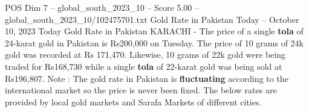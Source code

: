 \begin{textsample}{POS Dim 7 – global\_south\_2023\_10 – Score 5.00 – global\_south\_2023\_10/102475701.txt}
Gold Rate in Pakistan Today -- October 10, 2023 Today Gold Rate in Pakistan KARACHI - The price of a single \textbf{tola} of 24-karat gold in Pakistan is Rs200,000 on Tuesday.
The price of 10 grams of 24k gold was recorded at Rs 171,470.
Likewise, 10 grams of 22k gold were being traded for Rs168,730 while a single \textbf{tola} of 22-karat gold was being sold at Rs196,807.
Note : The gold rate in Pakistan is \textbf{fluctuating} according to the international market so the price is never been fixed.
The below rates are provided by local gold markets and Sarafa Markets of different cities.

\end{textsample}
